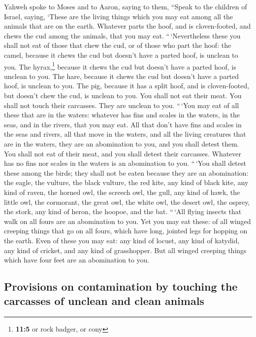  Yahweh spoke to Moses and to Aaron, saying to them,
 ``Speak to the children of Israel, saying, `These are the
living things which you may eat among all the animals that are on the
earth.  Whatever parts the hoof, and is cloven-footed, and
chews the cud among the animals, that you may eat. 
``\,`Nevertheless these you shall not eat of those that chew the cud, or
of those who part the hoof: the camel, because it chews the cud but
doesn't have a parted hoof, is unclean to you.  The
hyrax,\footnote{\textbf{11:5} or rock badger, or cony} because it chews
the cud but doesn't have a parted hoof, is unclean to you.
 The hare, because it chews the cud but doesn't have a
parted hoof, is unclean to you.  The pig, because it has a
split hoof, and is cloven-footed, but doesn't chew the cud, is unclean
to you.  You shall not eat their meat. You shall not touch
their carcasses. They are unclean to you.  ``\,`You may
eat of all these that are in the waters: whatever has fins and scales in
the waters, in the seas, and in the rivers, that you may eat.
 All that don't have fins and scales in the seas and
rivers, all that move in the waters, and all the living creatures that
are in the waters, they are an abomination to you,  and
you shall detest them. You shall not eat of their meat, and you shall
detest their carcasses.  Whatever has no fins nor scales
in the waters is an abomination to you.  ``\,`You shall
detest these among the birds; they shall not be eaten because they are
an abomination: the eagle, the vulture, the black vulture,
 the red kite, any kind of black kite, 
any kind of raven,  the horned owl, the screech owl, the
gull, any kind of hawk,  the little owl, the cormorant,
the great owl,  the white owl, the desert owl, the
osprey,  the stork, any kind of heron, the hoopoe, and
the bat.  ``\,`All flying insects that walk on all fours
are an abomination to you.  Yet you may eat these: of all
winged creeping things that go on all fours, which have long, jointed
legs for hopping on the earth.  Even of these you may
eat: any kind of locust, any kind of katydid, any kind of cricket, and
any kind of grasshopper.  But all winged creeping things
which have four feet are an abomination to you.

\hypertarget{provisions-on-contamination-by-touching-the-carcasses-of-unclean-and-clean-animals}{%
\subsection{Provisions on contamination by touching the carcasses of
unclean and clean
animals}\label{provisions-on-contamination-by-touching-the-carcasses-of-unclean-and-clean-animals}}

